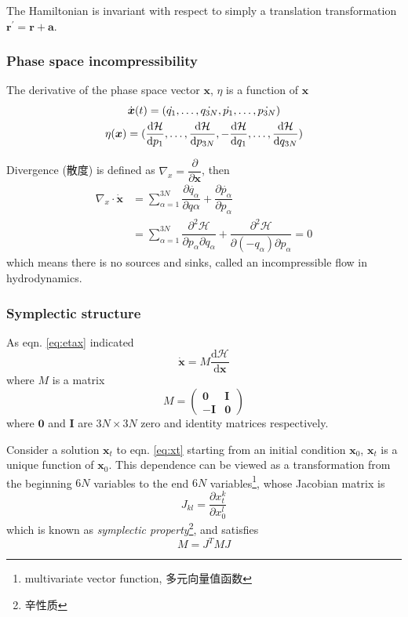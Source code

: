 \documentclass[
  10pt,
  twoside,
  openany,
  b5paper, %
  colorscheme = bootstrap-v4, %
]{qyxf-book}
\numberwithin{equation}{section}
\newcommand{\md}{\mathrm{d}}
\newcommand{\der}[2]{\dfrac{\md #1}{\md #2}}
\newcommand{\p}[2]{\dfrac{\partial #1}{\partial #2}}
\newcommand{\pd}[3]{\dfrac{\partial^2 #1}{\partial #2 \partial #3}}
\newcommand{\vr}{\boldsymbol{r}}
\newcommand{\vx}{\boldsymbol{x}}
\newcommand{\suman}{\sum_{\alpha=1}^{3N}}
\newcommand{\ham}{\mathcal{H}} %
\begin{document}
The Hamiltonian is invariant with respect to simply a translation transformation $\vr^\prime=\vr+\boldsymbol{a}$.

\subsubsection{Phase space incompressibility}
The derivative of the phase space vector $\vx$, $\eta$ is a function of $\vx$
\begin{gather}
	\dot{\vx}(t)=\left(\dot{q_1},\dots,\dot{q_{3N}},\dot{p_1},\dots,\dot{p_{3N}}\right) \notag\\
	\eta(\vx)=(\der{\ham}{p_1},\dots,\der{\ham}{p_{3N}},-\der{\ham}{q_1},\dots,\der{\ham}{q_{3N}}) \label{eq:etax}
\end{gather}

Divergence (散度) is defined as $\nabla_x=\p{}{\boldsymbol{x}}$, then
\begin{align*}
	\nabla_x\cdot\dot{\vx}&=\suman\p{\dot{q_\alpha}}{q\alpha}+\p{\dot{p_\alpha}}{p_\alpha}\\
	&=\suman\pd{\ham}{p_\alpha}{q_\alpha}+\pd{\ham}{(-q_\alpha)}{p_\alpha}=0
\end{align*}
which means there is no sources and sinks, called an incompressible flow in hydrodynamics.

\subsubsection{Symplectic structure}
As eqn. \ref{eq:etax} indicated
\begin{equation}
	\dot{\vx}=M\der{\ham}{\vx} \label{eq:xt}
\end{equation}
where $M$ is a matrix
\begin{equation}
	M=\begin{pmatrix}
		\boldsymbol{0} & \boldsymbol{I}\\
		-\boldsymbol{I}& \boldsymbol{0}
	\end{pmatrix}
\end{equation}
where $\boldsymbol{0}$ and $\boldsymbol{I}$ are $3N\times 3N$ zero and identity matrices respectively.

Consider a solution $\vx_t$ to eqn. \ref{eq:xt} starting from an initial condition $\vx_0$, $\vx_t$ is a unique function of $\vx_0$. This dependence can be viewed as a transformation from the beginning $6N$ variables to the end $6N$ variables\footnote{multivariate vector function, 多元向量值函数}, whose Jacobian matrix is
\begin{equation}
	J_{kl}=\p{x_t^k}{x_0^l}
\end{equation}
which is known as \textit{symplectic property}\footnote{辛性质}, and satisfies
\begin{equation}
	M=J^TMJ
\end{equation}
\end{document}
